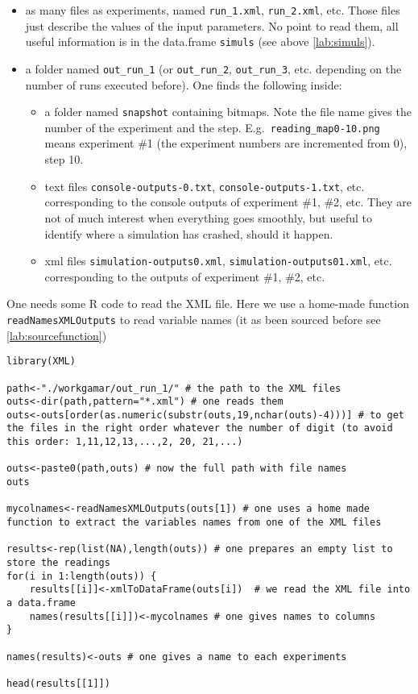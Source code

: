 \begin{itemize}
	\item as many files as experiments, named \texttt{run\_1.xml}, \texttt{run\_2.xml}, etc. Those files just describe the values of the input parameters. No point to read them, all useful information is in the data.frame \texttt{simuls} (see above \ref{lab:simuls}).
	\item a folder named \texttt{out\_run\_1} (or \texttt{out\_run\_2}, \texttt{out\_run\_3}, etc. depending on the number of runs executed before). One finds the following inside:
	\begin{itemize}
		\item a folder named  \texttt{snapshot} containing bitmaps. Note the file name gives the number of the experiment and the step. E.g.\texttt{ reading\_map0-10.png} means experiment \#1 (the experiment numbers are incremented from 0), step 10.
		\item text files \texttt{console-outputs-0.txt}, \texttt{console-outputs-1.txt}, etc. corresponding to the console outputs of experiment \#1, \#2, etc. They are not of much interest when everything goes smoothly, but useful to identify where a simulation has crashed, should it happen.
		\item xml files \texttt{simulation-outputs0.xml}, \texttt{simulation-outputs01.xml}, etc. corresponding to the outputs of experiment \#1, \#2, etc.
	\end{itemize}
\end{itemize}

One needs some R code to read the XML file. Here we use a home-made function \texttt{readNamesXMLOutputs} to read variable names (it as been sourced before see \ref{lab:sourcefunction})

\begin{lstlisting}
library(XML)

path<-"./workgamar/out_run_1/" # the path to the XML files
outs<-dir(path,pattern="*.xml") # one reads them
outs<-outs[order(as.numeric(substr(outs,19,nchar(outs)-4)))] # to get the files in the right order whatever the number of digit (to avoid this order: 1,11,12,13,...,2, 20, 21,...)

outs<-paste0(path,outs) # now the full path with file names
outs

mycolnames<-readNamesXMLOutputs(outs[1]) # one uses a home made function to extract the variables names from one of the XML files

results<-rep(list(NA),length(outs)) # one prepares an empty list to store the readings
for(i in 1:length(outs)) {
	results[[i]]<-xmlToDataFrame(outs[i])  # we read the XML file into a data.frame
	names(results[[i]])<-mycolnames # one gives names to columns
}

names(results)<-outs # one gives a name to each experiments

head(results[[1]])

\end{lstlisting}

